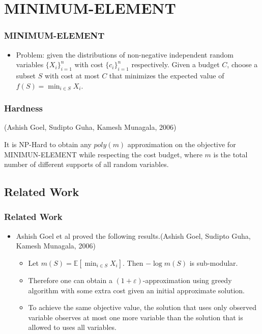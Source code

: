 \documentclass[serif,envcountsect]{beamer}
\newcommand{\Exp}{{\mathbb{E}}}
\begin{document}
\section{MINIMUM-ELEMENT}
\begin{frame}\frametitle{MINIMUM-ELEMENT}
\begin{itemize}
\item Problem: given the distributions of non-negative independent random variables $\{X_i\}_{i=1}^n$ with cost $\{c_i\}_{i=1}^n$ respectively. Given a budget $C$, choose a subset $S$ with cost at most $C$ that minimizes the expected value of $f(S) = \min_{i\in S} X_i$.
\end{itemize}
\end{frame}

\begin{frame}\frametitle{Hardness}
\begin{theorem}
(Ashish Goel, Sudipto Guha, Kamesh Munagala, 2006)

It is NP-Hard to obtain any $poly(m)$ approximation on the objective for MINIMUN-ELEMENT while respecting the cost budget, where $m$ is the total number of different supports of all random variables.
\end{theorem}
\end{frame}

\subsection{Related Work}

\begin{frame}\frametitle{Related Work}
\begin{itemize}
\item Ashish Goel et al proved the following results.(Ashish Goel, Sudipto Guha, Kamesh Munagala, 2006)
\begin{itemize}
\item Let $m(S) = \Exp[\min_{i\in S} X_i]$. Then $-\log m(S)$ is sub-modular.
\item Therefore one can obtain a $(1+\varepsilon)$-approximation using greedy algorithm with some extra cost given an initial approximate solution.
\item To achieve the same objective value, the solution that uses only observed variable observes at most one more variable than the solution that is allowed to uses all variables.
\end{itemize}
\end{itemize}
\end{frame}
\end{document}
